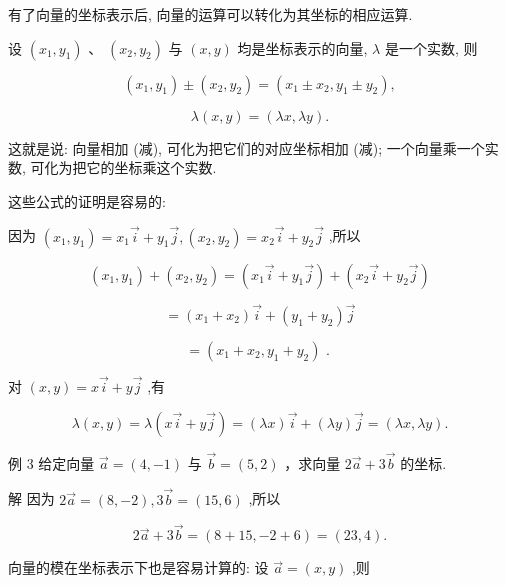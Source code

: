 \documentclass[10pt]{article}
\begin{document}
有了向量的坐标表示后, 向量的运算可以转化为其坐标的相应运算.

设 \(\left( {{x}_{1},{y}_{1}}\right) \text{ 、 }\left( {{x}_{2},{y}_{2}}\right)\) 与 \(\left( {x,y}\right)\) 均是坐标表示的向量, \(\lambda\) 是一个实数, 则

\[
\left( {{x}_{1},{y}_{1}}\right)  \pm  \left( {{x}_{2},{y}_{2}}\right)  = \left( {{x}_{1} \pm  {x}_{2},{y}_{1} \pm  {y}_{2}}\right) ,
\]

\[
\lambda \left( {x,y}\right)  = \left( {{\lambda x},{\lambda y}}\right) .
\]

这就是说: 向量相加 (减), 可化为把它们的对应坐标相加 (减); 一个向量乘一个实数, 可化为把它的坐标乘这个实数.

这些公式的证明是容易的:

因为 \(\left( {{x}_{1},{y}_{1}}\right)  = {x}_{1}\overrightarrow{i} + {y}_{1}\overrightarrow{j},\left( {{x}_{2},{y}_{2}}\right)  = {x}_{2}\overrightarrow{i} + {y}_{2}\overrightarrow{j}\) ,所以

\[
\left( {{x}_{1},{y}_{1}}\right)  + \left( {{x}_{2},{y}_{2}}\right)  = \left( {{x}_{1}\overrightarrow{i} + {y}_{1}\overrightarrow{j}}\right)  + \left( {{x}_{2}\overrightarrow{i} + {y}_{2}\overrightarrow{j}}\right)
\]

\[
= \left( {{x}_{1} + {x}_{2}}\right) \overrightarrow{i} + \left( {{y}_{1} + {y}_{2}}\right) \overrightarrow{j}
\]

\[
= \left( {{x}_{1} + {x}_{2},{y}_{1} + {y}_{2}}\right) \text{ . }
\]

对 \(\left( {x,y}\right)  = x\overrightarrow{i} + y\overrightarrow{j}\) ,有

\[
\lambda \left( {x,y}\right)  = \lambda \left( {x\overrightarrow{i} + y\overrightarrow{j}}\right)  = \left( {\lambda x}\right) \overrightarrow{i} + \left( {\lambda y}\right) \overrightarrow{j} = \left( {{\lambda x},{\lambda y}}\right) .
\]

例 3 给定向量 \(\overrightarrow{a} = \left( {4, - 1}\right)\) 与 \(\overrightarrow{b} = \left( {5,2}\right)\) ，求向量 \(2\overrightarrow{a} + 3\overrightarrow{b}\) 的坐标.

解 因为 \(2\overrightarrow{a} = \left( {8, - 2}\right) ,3\overrightarrow{b} = \left( {{15},6}\right)\) ,所以

\[
2\overrightarrow{a} + 3\overrightarrow{b} = \left( {8 + {15}, - 2 + 6}\right)  = \left( {{23},4}\right) .
\]

向量的模在坐标表示下也是容易计算的: 设 \(\overrightarrow{a} = \left( {x,y}\right)\) ,则
\end{document}
